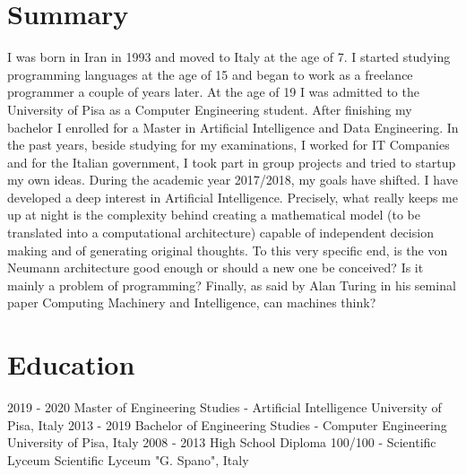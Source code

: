 \documentclass[]{friggeri-cv}
\begin{document}

\section{Summary}
\vspace{-3mm}
I was born in Iran in 1993 and moved to Italy at the age of 7. I started
studying programming languages at the age of 15 and began to work as a freelance
programmer a couple of years later. At the age of 19 I was admitted to the
University of Pisa as a Computer Engineering student. After finishing my
bachelor I enrolled for a Master in Artificial Intelligence and Data
Engineering. In the past years, beside studying for my examinations, I worked
for IT Companies and for the Italian government, I took part in group projects
and tried to startup my own ideas. During the academic year 2017/2018, my goals
have shifted. I have developed a deep interest in Artificial Intelligence.
Precisely, what really keeps me up at night is the complexity behind creating a
mathematical model (to be translated into a computational architecture) capable
of independent decision making and of generating original thoughts. To this very
specific end, is the von Neumann architecture good enough or should a new one be
conceived? Is it mainly a problem of programming? Finally, as said by Alan
Turing in his seminal paper Computing Machinery and Intelligence, can machines
think?


\section{Education}
\vspace{-3mm}
\begin{entrylist}
\entry
{2019 - 2020}
{Master {\normalfont\small{of Engineering Studies - Artificial Intelligence}}}
{University of Pisa, Italy}
{\vspace{-3mm}}
\entry
{2013 - 2019}
{Bachelor {\normalfont\small{of Engineering Studies - Computer Engineering}}}
{University of Pisa, Italy}
{\vspace{-3mm}}
\entry
{2008 - 2013}
{High School Diploma {\normalfont\small{100/100 - Scientific Lyceum}}}
{Scientific Lyceum "G. Spano", Italy}
{\vspace{-5mm}}
\end{entrylist}
\end{document}
